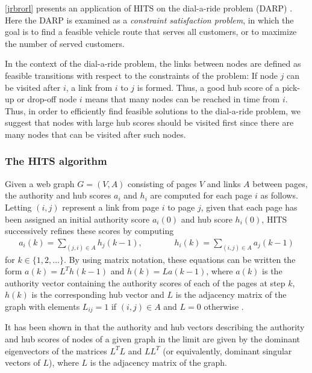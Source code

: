 \documentclass[dissertation,draft*]{aaltoseries}
\begin{document}
\ref{jrbrorl} presents an application of HITS on the dial-a-ride problem (DARP)
\cite{berbegliathesis,berbegliahybrid,berbegliafeas}.
Here the DARP is examined as a \emph{constraint satisfaction problem}, in which the goal
is to find a feasible vehicle route that serves all customers, or to maximize the number of served customers.

In the context of the dial-a-ride problem, 
the links between nodes are defined as feasible transitions with respect to the %
constraints of the problem: If node $j$ can be visited after $i$, a link from $i$ to $j$ 
is formed. Thus, a good hub score of a pick-up or drop-off node $i$ means 
that many nodes can be reached in time from $i$. 
Thus, in order to efficiently find feasible solutions to the dial-a-ride problem, we suggest that nodes with large 
hub scores should be visited first since there are many nodes that can
be visited after such nodes. 


\subsubsection{The HITS algorithm \cite{kleinberg}}
\label{hits}
Given a web graph $G = (V,A)$ consisting of pages $V$ and links $A$ between pages,
the authority and hub scores $a_i$ and $h_i$ are computed for each page $i$ as follows.
Letting 
$(i,j)$ represent a link from page $i$ to page $j$, given that each page has been 
assigned an initial authority score $a_i(0)$ and hub score $h_i(0)$, HITS successively
refines these scores by computing
\begin{align*}
a_i(k)  = \sum_{(j,i) \in A} h_j(k-1), \ \ \ \ \ \ \ \ \ \ \  \ \ \ \ \ \ 
h_i(k)  = \sum_{(i,j) \in A} a_j(k-1)
\end{align*}
for $k \in \{1,2,\ldots\}$. By using matrix notation, these equations can be written the form 
$a(k) = L^T h(k-1)$ and $h(k) = L a(k-1)$,
where $a(k)$ is the authority vector containing the authority scores of
each of the pages at step $k$, $h(k)$ is the corresponding hub vector and
$L$ is the adjacency matrix of the graph with elements $L_{ij} = 1$ if
$(i,j) \in A$ and $L=0$ otherwise \cite{langville}. 

It has been shown in \cite{farahat} that the authority and hub vectors
describing the authority and hub scores of nodes of a given graph in the limit are given by 
the dominant eigenvectors of the matrices $L^TL$ and $LL^T$ 
(or equivalently, dominant singular vectors of $L$), 
where $L$ is the adjacency matrix of the graph. 
\end{document}
